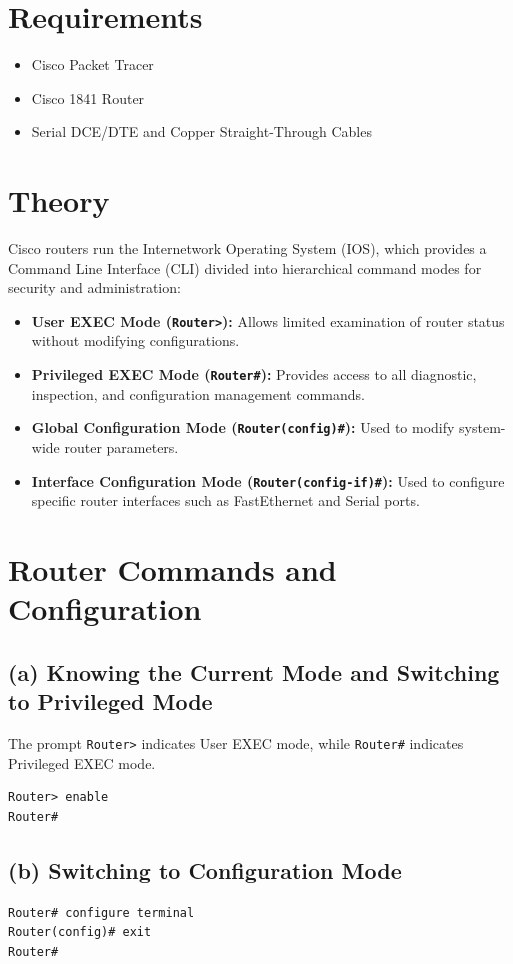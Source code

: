 \documentclass[12pt, a4paper]{report}
\begin{document}
\section*{Requirements}
\begin{itemize}
	\item Cisco Packet Tracer
	\item Cisco 1841 Router
	\item Serial DCE/DTE and Copper Straight-Through Cables
\end{itemize}

\section*{Theory}
Cisco routers run the Internetwork Operating System (IOS), which provides a Command Line Interface (CLI) divided into hierarchical command modes for security and administration:
\begin{itemize}
	\item \textbf{User EXEC Mode (\texttt{Router>}):} Allows limited examination of router status without modifying configurations.
	\item \textbf{Privileged EXEC Mode (\texttt{Router\#}):} Provides access to all diagnostic, inspection, and configuration management commands.
	\item \textbf{Global Configuration Mode (\texttt{Router(config)\#}):} Used to modify system-wide router parameters.
	\item \textbf{Interface Configuration Mode (\texttt{Router(config-if)\#}):} Used to configure specific router interfaces such as FastEthernet and Serial ports.
\end{itemize}

\section*{Router Commands and Configuration}

\subsection*{(a) Knowing the Current Mode and Switching to Privileged Mode}
The prompt \texttt{Router>} indicates User EXEC mode, while \texttt{Router\#} indicates Privileged EXEC mode.
\begin{lstlisting}
Router> enable
Router#
\end{lstlisting}

\subsection*{(b) Switching to Configuration Mode}
\begin{lstlisting}
Router# configure terminal
Router(config)# exit
Router#
\end{lstlisting}
\end{document}
